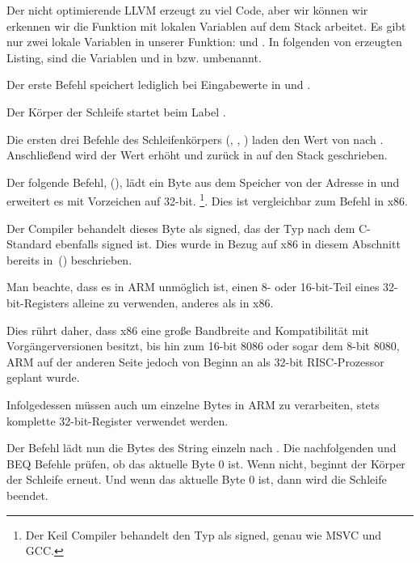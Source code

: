 
\mysubparagraph{\NonOptimizingXcodeIV (\ARMMode)}



Der nicht optimierende LLVM erzeugt zu viel Code, aber wir können wir erkennen
wir die Funktion mit lokalen Variablen auf dem Stack arbeitet. 
Es gibt nur zwei lokale Variablen in unserer Funktion:  und .
In folgenden von \IDA erzeugten Listing, sind die Variablen  und
 in  bzw.  umbenannt.

Der erste Befehl speichert lediglich bei Eingabewerte in  und .

Der Körper der Schleife startet beim Label .

Die ersten drei Befehle des Schleifenkörpers (, \ADD, ) laden
den Wert von  nach . 
Anschließend wird der Wert erhöht und zurück in  auf den Stack
geschrieben.

Der folgende Befehl,  (), lädt
ein Byte aus dem Speicher von der Adresse in  und erweitert es mit
Vorzeichen auf 32-bit.
\footnote{Der Keil Compiler behandelt den Typ \Tchar als signed, genau wie
MSVC und GCC.}.
Dies ist vergleichbar zum \MOVSX Befehl in x86.

Der Compiler behandelt dieses Byte als signed, das der \Tchar Typ nach dem
C-Standard ebenfalls signed ist. 
Dies wurde in Bezug auf x86 in diesem Abschnitt bereits in~()
beschrieben.


Man beachte, dass es in ARM unmöglich ist, einen 8- oder 16-bit-Teil eines
32-bit-Registers alleine zu verwenden, anderes als in x86.

Dies rührt daher, dass x86 eine große Bandbreite and Kompatibilität mit
Vorgängerversionen besitzt, bis hin zum 16-bit 8086 oder sogar dem 8-bit 8080,
ARM auf der anderen Seite jedoch von Beginn an als 32-bit RISC-Prozessor geplant
wurde.

Infolgedessen müssen auch um einzelne Bytes in ARM zu verarbeiten, stets
komplette 32-bit-Register verwendet werden.

Der Befehl  lädt nun die Bytes des String einzeln nach .
Die nachfolgenden \CMP und \ac{BEQ} Befehle prüfen, ob das aktuelle Byte 0 ist.
Wenn nicht, beginnt der Körper der Schleife erneut.
Und wenn das aktuelle Byte 0 ist, dann wird die Schleife beendet.


